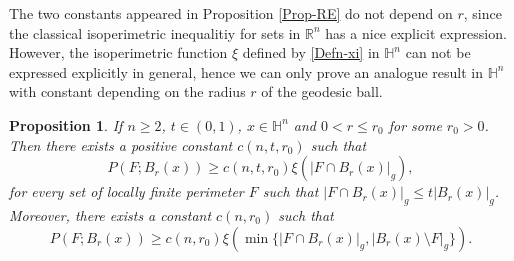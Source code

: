 \documentclass[11pt,reqno]{amsart}
\newtheorem{prop}[thm]{Proposition}
\theoremstyle{definition}
\theoremstyle{remark}
\numberwithin{equation}{section}
\renewcommand{\(}{\left(}
\renewcommand{\)}{\right)}
\renewcommand{\-}{\overline}
\begin{document}
The two constants appeared in Proposition \ref{Prop-RE} do not depend on $r$, since the classical isoperimetric inequalitiy for sets in $\mathbb{R}^n$ has a nice explicit expression. However, the isoperimetric function $\xi$ defined by \eqref{Defn-xi} in $\mathbb{H}^n$ can not be expressed explicitly in general, hence we can only prove an analogue result in $\mathbb{H}^n$ with constant depending on the radius $r$ of the geodesic ball.

\begin{prop}\label{Prop-REH}
	If $n\geq 2$, $t\in(0,1)$, $x\in\mathbb{H}^n$ and $0<r\leq r_0$ for some $r_0>0$. Then there exists a positive constant $c(n,t,r_0)$ such that 
	\begin{equation}\label{Prop-REH1}
		P(F;B_r(x))\geq c(n,t,r_0)\xi(|F\cap B_r(x)|_g),
	\end{equation}
for every set of locally finite perimeter $F$ such that $|F\cap B_r(x)|_g\leq t|B_r(x)|_g$. Moreover, there exists a constant $c(n,r_0)$ such that 
\begin{equation}\label{Prop-REH2}
	P(F;B_r(x))\geq c(n,r_0)\xi(\min\{|F\cap B_r(x)|_g, |B_r(x)\setminus F|_g\}).
\end{equation}
\end{prop}
\end{document}
